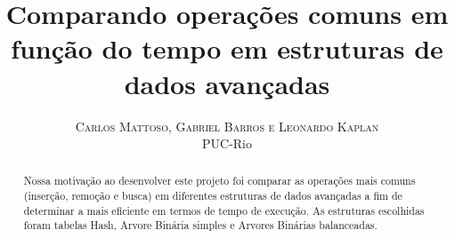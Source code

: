 \documentclass[twoside]{article}
\title{\vspace{-15mm}\fontsize{24pt}{10pt}\selectfont\textbf{Comparando operações comuns em função do tempo em estruturas de dados avançadas}} %
\author{
\large
\textsc{Carlos Mattoso, Gabriel Barros e Leonardo Kaplan
}\\[2mm] %
\normalsize PUC-Rio \\ %
}
\date{}
\begin{document}
\maketitle %

\thispagestyle{fancy} %


\begin{abstract}

\noindent 
Nossa motivação ao desenvolver este projeto foi comparar as operações mais comuns (inserção, remoção e busca) em diferentes estruturas de dados avançadas a fim de determinar a mais eficiente em termos de tempo de execução.
As estruturas escolhidas foram tabelas Hash, Arvore Binária simples e Arvores Binárias balanceadas. 

\end{abstract}

\end{document}
